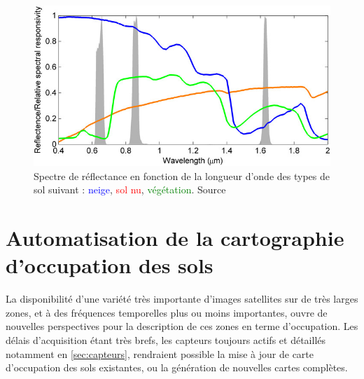 \begin{figure}
    \centering
    \includegraphics[scale=0.45]{Figures/chap1/vegetation_reflectance}
    \caption{Spectre de réflectance en fonction de la longueur d'onde des types de sol suivant : \textcolor{blue}{neige}, \textcolor{red}{sol nu}, \textcolor{green}{végétation}. Source\cite{wang2017rse}}
    \label{fig:vegetation_reflectance}
\end{figure}

\section{Automatisation de la cartographie d'occupation des sols}
\label{sec:ocs_auto}
La disponibilité d'une variété très importante d'images satellites sur de très larges zones, et à des fréquences temporelles plus ou moins importantes, ouvre de nouvelles perspectives pour la description de ces zones en terme d'occupation. Les délais d'acquisition étant très brefs, les capteurs toujours actifs et détaillés notamment en \ref{sec:capteurs}, rendraient possible la mise à jour de carte d'occupation des sols existantes, ou la génération de nouvelles cartes complètes.

